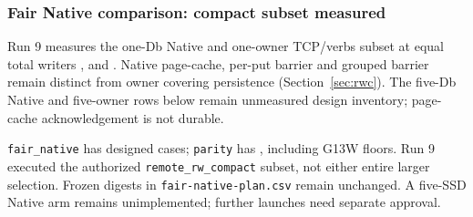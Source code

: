 \begin{minipage}{\linewidth}
\subsubsection{Fair Native comparison: compact subset measured}\label{sec:fair-native}
Run 9 measures the one-Db Native and one-owner TCP/verbs subset at equal total writers ,  and . Native page-cache, per-put barrier and grouped barrier remain distinct from owner covering persistence (Section~\ref{sec:rwc}). The five-Db Native and five-owner rows below remain unmeasured design inventory; page-cache acknowledgement is not durable.

\begin{table}[H]\centering{}
\caption{Frozen design inventory, not completed counts. Class A: Native page cache. Class B: Native per-put/grouped barrier and owner covering sync. No cross-class ranking. Run 9 includes G14N/G14O1 and three G14P diagnostics; G14S/G14O5 did not run. Instances, SSD location/count, network/security, sync scope and routing remain unmatched.}\label{tab:fair-native}
\end{table}

\texttt{fair\_native} has  designed cases; \texttt{parity} has , including  G13W floors. Run 9 executed the authorized \texttt{remote\_rw\_compact} subset, not either entire larger selection. Frozen digests in \texttt{fair-native-plan.csv} remain unchanged. A five-SSD Native arm remains unimplemented; further launches need separate approval.
\end{minipage}
